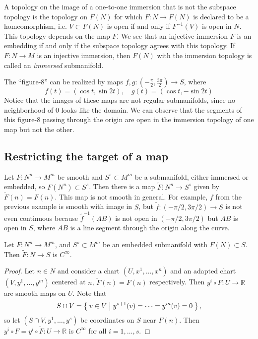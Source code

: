 A topology on the image of a one-to-one immersion that is not the
subspace topology is the topology on $F(N)$ for which
$F: N \to F(N)$ is declared to be a homeomorphism, i.e.
$V \subset F(N)$ is open if and only if $F^{-1}(V)$ is open in $N$.
This topology depends on the map $F$. We see that an injective
immersion $F$ is an embedding if and only if the subspace topology
agrees with this topology. If $F : N \to M$ is an injective immersion,
then $F(N)$ with the immersion topology is called an \emph{immersed}
submanifold.

\begin{xmpl}
The ``figure-8'' can be realized by maps
$f, g: \left(-\frac{\pi}{2}, \frac{3 \pi}{2}\right) \to S$, where
$$
f(t) = (\cos t, \sin 2t), \quad
g(t) = (\cos t, -\sin 2t)
$$
Notice that the images of these maps are not regular submanifolds,
since no neighborhood of 0 looks like the domain. We can observe that
the segments of this figure-8 passing through the origin are open in
the immersion topology of one map but not the other.
\end{xmpl}

\subsection{Restricting the target of a map}
Let $F: N^n \to M^m$ be smooth and $S^s \subset M^m$ be a submanifold,
either immersed or embedded, so $F(N^n) \subset S^s$. Then there is a
map $\tilde{F} : N^n \to S^s$ given by $\tilde{F}(n) = F(n)$. This map
is not smooth in general. For example, $f$ from the previous example
is smooth with image in $S$, but $\tilde{f} : (-\pi/2, 3\pi/2) \to S$
is not even continuous because $\tilde{f}^{-1}(AB)$ is not open in
$(-\pi/2, 3\pi/2)$ but $AB$ is open in $S$, where $AB$ is a line segment
through the origin along the curve.

\begin{prop}
Let $F : N^n \to M^m$, and $S^s \subset M^m$ be an embedded
submanifold with $F(N) \subset S$. Then
$\tilde{F}: N \to S$ is $C^\infty$.
\end{prop}

\begin{proof}
Let $n \in N$ and consider a chart $(U, x^1, \dots, x^n)$ and an
adapted chart $(V, y^1, \dots, y^m)$ centered at $n$,
$\tilde{F}(n) = F(n)$ respectively. Then
$y^i \circ F : U \to \mathbb{R}$ are smooth maps on $U$. Note that
$$
  S \cap V
= \Set{ v \in V | y^{s+1}(v) = \cdots = y^m(v) = 0 },
$$
so let $(S \cap V, y^1, \dots, y^s)$ be coordinates on $S$ near
$F(n)$. Then $y^i \circ F = y^i \circ \tilde{F} : U \to \mathbb{R}$ is
$C^\infty$ for all $i=1, \dots, s$.
\end{proof}

